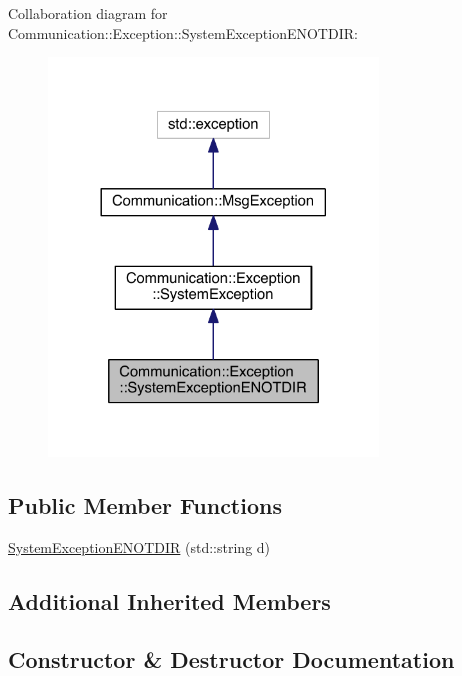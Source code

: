 Collaboration diagram for Communication\+:\+:Exception\+:\+:System\+Exception\+E\+N\+O\+T\+D\+I\+R\+:\nopagebreak
\begin{figure}[H]
\begin{center}
\leavevmode
\includegraphics[width=248pt]{class_communication_1_1_exception_1_1_system_exception_e_n_o_t_d_i_r__coll__graph}
\end{center}
\end{figure}
\subsection*{Public Member Functions}
\begin{DoxyCompactItemize}
\item 
\hyperlink{class_communication_1_1_exception_1_1_system_exception_e_n_o_t_d_i_r_af3bbff168bddfce7cb30f31f4ce2e9ca}{System\+Exception\+E\+N\+O\+T\+D\+I\+R} (std\+::string d)
\end{DoxyCompactItemize}
\subsection*{Additional Inherited Members}


\subsection{Constructor \& Destructor Documentation}
\hypertarget{class_communication_1_1_exception_1_1_system_exception_e_n_o_t_d_i_r_af3bbff168bddfce7cb30f31f4ce2e9ca}{}
